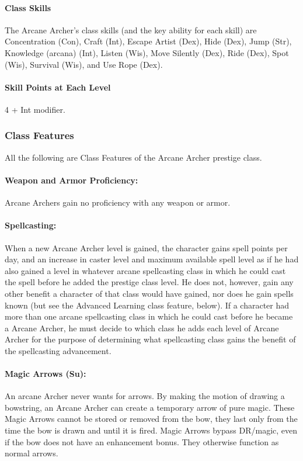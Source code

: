 \paragraph{Class Skills}
The Arcane Archer's class skills (and the key ability for each skill) are Concentration (Con), Craft (Int), Escape Artist (Dex), Hide (Dex), Jump (Str), Knowledge (arcana) (Int), Listen (Wis), Move Silently (Dex), Ride (Dex), Spot (Wis), Survival (Wis), and Use Rope (Dex).
\paragraph{Skill Points at Each Level}
4 + Int modifier.

\subsubsection{Class Features}
All the following are Class Features of the Arcane Archer prestige class.

\paragraph{Weapon and Armor Proficiency:} Arcane Archers gain no proficiency with any weapon or armor.

\paragraph{Spellcasting:} When a new Arcane Archer level is gained, the character gains spell points per day, and an increase in caster level and maximum available spell level as if he had also gained a level in whatever arcane spellcasting class in which he could cast the  spell before he added the prestige class level. 
He does not, however, gain any other benefit a character of that class would have gained, nor does he gain spells known (but see the Advanced Learning class feature, below). 
If a character had more than one arcane spellcasting class in which he could cast  before he became a Arcane Archer, he must decide to which class he adds each level of Arcane Archer for the purpose of determining what spellcasting class gains the benefit of the spellcasting advancement.

\paragraph{Magic Arrows (Su):}
An arcane Archer never wants for arrows.
By making the motion of drawing a bowstring, an Arcane Archer can create a temporary arrow of pure magic.
These Magic Arrows cannot be stored or removed from the bow, they last only from the time the bow is drawn and until it is fired.
Magic Arrows bypass DR/magic, even if the bow does not have an enhancement bonus.
They otherwise function as normal arrows.

